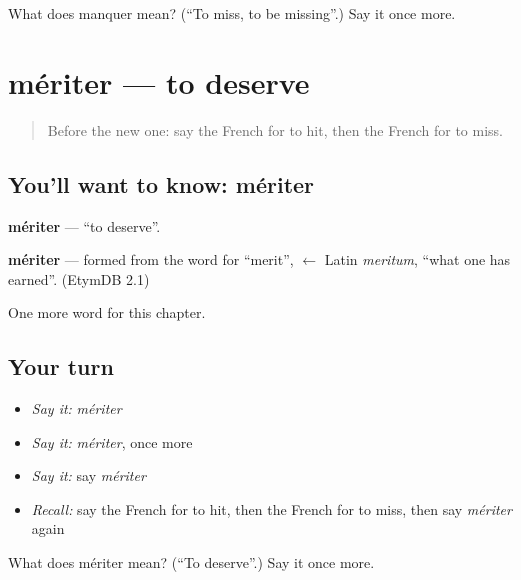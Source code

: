 \begin{tcolorbox}[breakable,colback=teal!4,colframe=teal!35!black,title={Before you move on}]
What does manquer mean? (\textquotedblleft{}To miss, to be missing\textquotedblright{}.) Say it once more.
\end{tcolorbox}
\section[mériter]{mériter — to deserve}

\label{lesson:FR-C237-meriter}



\begin{quote}
Before the new one: say the French for to hit, then the French for to miss.
\end{quote}

\subsection*{You'll want to know: mériter}
\textbf{mériter} — \textquotedblleft{}to deserve\textquotedblright{}.

\begin{cousinweb}
\textbf{mériter} — formed from the word for \textquotedblleft{}merit\textquotedblright{}, $\leftarrow$ Latin \emph{meritum}, \textquotedblleft{}what one has earned\textquotedblright{}. (EtymDB 2.1)
\end{cousinweb}

\begin{grammarlens}[title={What you've built}]
One more word for this chapter.
\end{grammarlens}

\subsection*{Your turn}
\begin{itemize}
\raggedright
  \item \emph{Say it:} \emph{mériter}
  \item \emph{Say it:} \emph{mériter}, once more
  \item \emph{Say it:} say \emph{mériter}
  \item \emph{Recall:} say the French for to hit, then the French for to miss, then say \emph{mériter} again
\end{itemize}

\begin{tcolorbox}[breakable,colback=teal!4,colframe=teal!35!black,title={Before you move on}]
What does mériter mean? (\textquotedblleft{}To deserve\textquotedblright{}.) Say it once more.
\end{tcolorbox}
